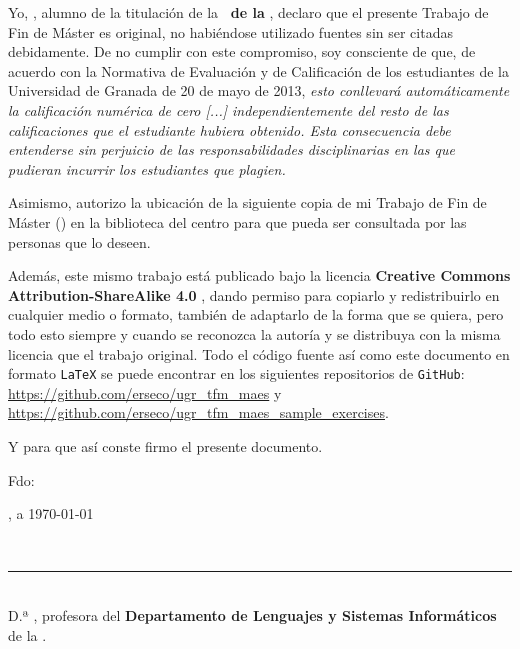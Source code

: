 {{Yo, \textbf{\autor}, alumno de la titulación \textbf{\master} de la \textbf{\escuela\ de la \universidad}, declaro que el presente Trabajo de Fin de Máster es original, no habiéndose utilizado fuentes sin ser citadas debidamente. De no cumplir con este compromiso, soy consciente de que, de acuerdo con la Normativa de Evaluación y de Calificación de los estudiantes de la Universidad de Granada de 20 de mayo de 2013, \textit{esto conllevará automáticamente la calificación numérica de cero [...] independientemente del resto de las calificaciones que el estudiante hubiera obtenido. Esta consecuencia debe entenderse sin perjuicio de las responsabilidades disciplinarias en las que pudieran incurrir los estudiantes que plagien.}

\bigskip
Asimismo, autorizo la ubicación de la siguiente copia de mi Trabajo de Fin de Máster (\textit{\titulo}) en la biblioteca del centro para que pueda ser consultada por las personas que lo deseen.

\bigskip
Además, este mismo trabajo está publicado bajo la licencia \textbf{Creative Commons Attribution-ShareAlike 4.0} \cite{CC}, dando permiso para copiarlo y redistribuirlo en cualquier medio o formato, también de adaptarlo de la forma que se quiera, pero todo esto siempre y cuando se reconozca la autoría y se distribuya con la misma licencia que el trabajo original. Todo el código fuente así como este documento en formato {\tt LaTeX} se puede encontrar en los siguientes repositorios de {\tt GitHub}: \url{https://github.com/erseco/ugr_tfm_maes} y \url{https://github.com/erseco/ugr_tfm_maes_sample_exercises}.

\bigskip
Y para que así conste firmo el presente documento.

\vspace{3cm}

\noindent Fdo: \autor

\vspace{3cm}

\begin{flushright}
\ciudad, a \today
\end{flushright}

\newpage
\thispagestyle{empty}
\
\vspace{2cm}

\noindent\rule[-1ex]{\textwidth}{2pt}\\[4.5ex]

D.ª \textbf{\tutor}, profesora del \textbf{Departamento de Lenguajes y Sistemas Informáticos} de la \textbf{\universidad}.

}}
